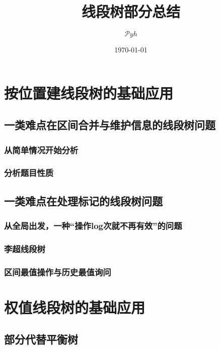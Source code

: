 \documentclass[a4paper]{article}
\date{\today}
\title{线段树部分总结}
\author{$\mathcal Pyh$}
\begin{document}
\maketitle

\section{按位置建线段树的基础应用}

\subsection{一类难点在区间合并与维护信息的线段树问题}

\subsubsection{从简单情况开始分析}

\subsubsection{分析题目性质}

\subsection{一类难点在处理标记的线段树问题}

\subsubsection{从全局出发，一种“操作log次就不再有效”的问题}

\subsubsection{李超线段树}

\subsubsection{区间最值操作与历史最值询问}

\section{权值线段树的基础应用}

\subsection{部分代替平衡树}
\end{document}
